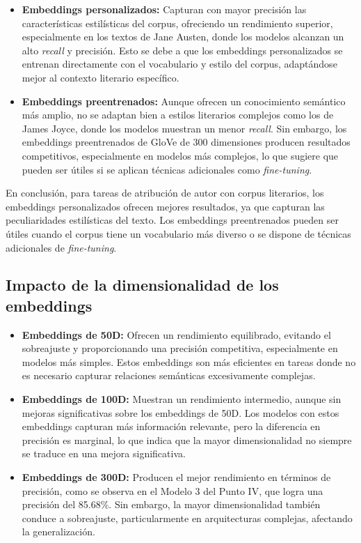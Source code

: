 \documentclass[11pt,english]{article}
\theoremstyle{plain}
\begin{document}
\begin{itemize}
    \item \textbf{Embeddings personalizados:} Capturan con mayor precisión las características estilísticas del corpus, ofreciendo un rendimiento superior, especialmente en los textos de Jane Austen, donde los modelos alcanzan un alto \textit{recall} y precisión. Esto se debe a que los embeddings personalizados se entrenan directamente con el vocabulario y estilo del corpus, adaptándose mejor al contexto literario específico.
    \item \textbf{Embeddings preentrenados:} Aunque ofrecen un conocimiento semántico más amplio, no se adaptan bien a estilos literarios complejos como los de James Joyce, donde los modelos muestran un menor \textit{recall}. Sin embargo, los embeddings preentrenados de GloVe de 300 dimensiones producen resultados competitivos, especialmente en modelos más complejos, lo que sugiere que pueden ser útiles si se aplican técnicas adicionales como \textit{fine-tuning}.
\end{itemize}

En conclusión, para tareas de atribución de autor con corpus literarios, los embeddings personalizados ofrecen mejores resultados, ya que capturan las peculiaridades estilísticas del texto. Los embeddings preentrenados pueden ser útiles cuando el corpus tiene un vocabulario más diverso o se dispone de técnicas adicionales de \textit{fine-tuning}.

\subsection*{Impacto de la dimensionalidad de los embeddings}

\begin{itemize}
    \item \textbf{Embeddings de 50D:} Ofrecen un rendimiento equilibrado, evitando el sobreajuste y proporcionando una precisión competitiva, especialmente en modelos más simples. Estos embeddings son más eficientes en tareas donde no es necesario capturar relaciones semánticas excesivamente complejas.
    \item \textbf{Embeddings de 100D:} Muestran un rendimiento intermedio, aunque sin mejoras significativas sobre los embeddings de 50D. Los modelos con estos embeddings capturan más información relevante, pero la diferencia en precisión es marginal, lo que indica que la mayor dimensionalidad no siempre se traduce en una mejora significativa.
    \item \textbf{Embeddings de 300D:} Producen el mejor rendimiento en términos de precisión, como se observa en el Modelo 3 del Punto IV, que logra una precisión del 85.68\%. Sin embargo, la mayor dimensionalidad también conduce a sobreajuste, particularmente en arquitecturas complejas, afectando la generalización.
\end{itemize}
\end{document}
